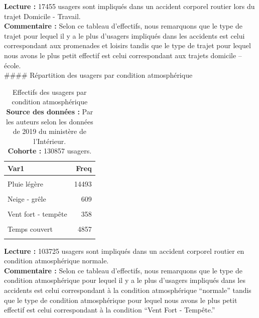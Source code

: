 \documentclass[french,]{tp}
\begin{document}
\textbf{Lecture :} 17455 usagers sont impliqués dans un accident corporel routier lors du trajet Domicile - Travail.\\
\textbf{Commentaire :} Selon ce tableau d'effectifs, nous remarquons que le type de trajet pour lequel il y a le plus d'usagers impliqués dans les accidents est celui correspondant aux promenades et loisirs tandis que le type de trajet pour lequel nous avons le plus petit effectif est celui correspondant aux trajets domicile -- école.\\
\#\#\#\# Répartition des usagers par condition atmosphérique




\begin{table}[H]

\caption{\label{tab:tablecond}Effectifs des usagers par condition atmosphérique
\textbf{Source des données :} Par les auteurs selon les données de 2019 du ministère de l'Intérieur.\\
\textbf{Cohorte :} 130857 usagers.\\}
\centering
\begin{tabular}[t]{lr}
\toprule
\textbf{Var1} & \textbf{Freq}\\
\midrule
\cellcolor{gray!6}{Normale} & \cellcolor{gray!6}{103725}\\
Pluie légère & 14493\\
\cellcolor{gray!6}{Pluie forte} & \cellcolor{gray!6}{3183}\\
Neige - grêle & 609\\
\cellcolor{gray!6}{Brouillard - fumée} & \cellcolor{gray!6}{708}\\
\addlinespace
Vent fort - tempête & 358\\
\cellcolor{gray!6}{Temps éblouissant} & \cellcolor{gray!6}{2288}\\
Temps couvert & 4857\\
\cellcolor{gray!6}{Autre} & \cellcolor{gray!6}{636}\\
\bottomrule
\end{tabular}
\end{table}

\textbf{Lecture :} 103725 usagers sont impliqués dans un accident corporel routier en condition atmosphérique normale.\\
\textbf{Commentaire :} Selon ce tableau d'effectifs, nous remarquons que le type de condition atmosphérique pour lequel il y a le plus d'usagers impliqués dans les accidents est celui correspondant à la condition atmosphérique ``normale'' tandis que le type de condition atmosphérique pour lequel nous avons le plus petit effectif est celui correspondant à la condition ``Vent Fort - Tempête.''
\end{document}
